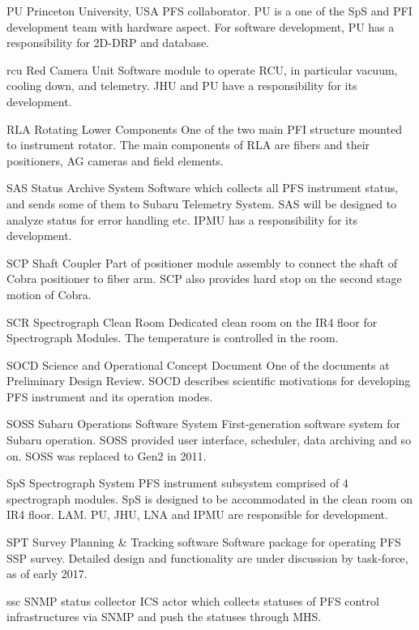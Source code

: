 {PU}
{Princeton University, USA}
{PFS collaborator. PU is a one of the SpS and PFI development team with hardware aspect. For software development, PU has a responsibility for 2D-DRP and database.}


{rcu}
{Red Camera Unit}
{Software module to operate RCU, in particular vacuum, cooling down, and telemetry. JHU and PU have a responsibility for its development.}


{RLA}
{Rotating Lower Components}
{One of the two main PFI structure mounted to instrument rotator. The main components of RLA are fibers and their positioners, AG cameras and field elements.}


{SAS}
{Status Archive System}
{Software which collects all PFS instrument status, and sends some of them to Subaru Telemetry System. SAS will be designed to analyze status for error handling etc. IPMU has a responsibility for its development.}


{SCP}
{Shaft Coupler}
{Part of positioner module assembly to connect the shaft of Cobra positioner to fiber arm. SCP also provides hard stop on the second stage motion of Cobra.}


{SCR}
{Spectrograph Clean Room}
{Dedicated clean room on the IR4 floor for Spectrograph Modules. The temperature is controlled in the room.}


{SOCD}
{Science and Operational Concept Document}
{One of the documents at Preliminary Design Review. SOCD describes scientific motivations for developing PFS instrument and its operation modes.}


{SOSS}
{Subaru Operations Software System}
{First-generation software system for Subaru operation. SOSS provided user interface, scheduler, data archiving and so on. SOSS was replaced to Gen2 in 2011.}


{SpS}
{Spectrograph System}
{PFS instrument subsystem comprised of 4 spectrograph modules. SpS is designed to be accommodated in the clean room on IR4 floor. LAM. PU, JHU, LNA and IPMU are responsible for development.}


{SPT}
{Survey Planning \& Tracking software}
{Software package for operating PFS SSP survey. Detailed design and functionality are under discussion by task-force, as of early 2017.}


{ssc}
{SNMP status collector}
{ICS actor which collects statuses of PFS control infrastructures via SNMP and push the statuses through MHS.}


